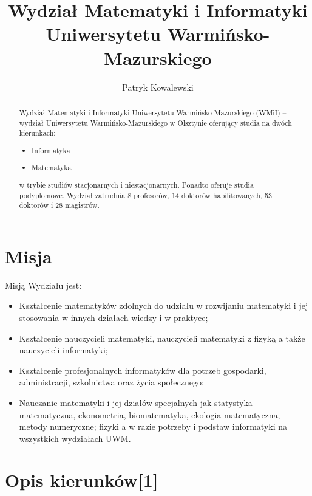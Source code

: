 \documentclass[a4paper,12pt]{article}
\title{Wydział Matematyki i Informatyki Uniwersytetu Warmińsko-Mazurskiego}
\author{Patryk Kowalewski}
\begin{document}
\maketitle

\begin{abstract}
Wydział Matematyki i Informatyki Uniwersytetu Warmińsko-Mazurskiego (WMiI) – wydział 
Uniwersytetu Warmińsko-Mazurskiego w Olsztynie oferujący studia na dwóch kierunkach:

\begin{itemize}

\item Informatyka

\item Matematyka

\end{itemize}

w trybie studiów stacjonarnych i niestacjonarnych. Ponadto oferuje studia podyplomowe.
Wydział zatrudnia 8 profesorów, 14 doktorów habilitowanych, 53 doktorów i 28 magistrów.
\end{abstract}

\section{Misja}

Misją Wydziału jest:

\begin{itemize}

\item Kształcenie matematyków zdolnych do udziału w rozwijaniu matematyki i jej stosowania w innych
działach wiedzy i w praktyce;

\item Kształcenie nauczycieli matematyki, nauczycieli matematyki z fizyką a także nauczycieli informatyki;

\item Kształcenie profesjonalnych informatyków dla potrzeb gospodarki, administracji, szkolnictwa oraz życia
społecznego;

\item Nauczanie matematyki i jej działów specjalnych jak statystyka matematyczna, ekonometria,
biomatematyka, ekologia matematyczna, metody numeryczne; fizyki a w razie potrzeby i podstaw
informatyki na wszystkich wydziałach UWM.

\end{itemize}

\section{Opis kierunków[1]}
\end{document}
